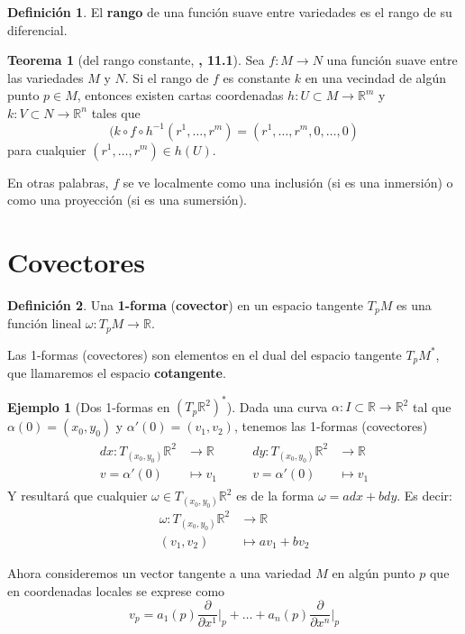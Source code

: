 \documentclass[spanish]{book}
\theoremstyle{definition}
\newtheorem*{defn}{Definición}
\newtheorem*{teo}{Teorema}
\newtheorem*{ejem}{Ejemplo}
\newcommand{\R}{\mathbb{R}}
\begin{document}
\begin{defn}
	El \textbf{rango} de una función suave entre variedades es el rango de su diferencial.
\end{defn}
\begin{teo}[del rango constante, \cite{Loring}\textbf{, 11.1}]
	Sea $f:M\to N$ una función suave entre las variedades $M$ y $N$. Si el rango de $f$ es constante $k$ en una vecindad de algún punto $p\in M$, entonces existen cartas coordenadas $h:U\subset M\to\R^m$ y $k:V\subset N\to\R^n$ tales que
	\[(k\circ f\circ h^{-1}(r^1,\ldots,r^m)=(r^1,\ldots,r^m,0,\ldots,0)\]
	para cualquier $(r^1,\ldots,r^m)\in h(U)$.
\end{teo}
En otras palabras, $f$ se ve localmente como una inclusión (si es una inmersión) o como una proyección (si es una sumersión).
\section{Covectores}
\begin{defn}
	Una \textbf{1-forma} (\textbf{covector}) en un espacio tangente $T_pM$ es una función lineal $\omega:T_pM\to\R$.
\end{defn}
Las 1-formas (covectores) son elementos en el dual del espacio tangente $T_pM^*$, que llamaremos el espacio \textbf{cotangente}.
\begin{ejem}[Dos 1-formas en $(T_p\R^2)^*$]
	Dada una curva $\alpha:I\subset\R\to\R^2$ tal que $\alpha(0)=(x_0,y_0)$ y $\alpha'(0)=(v_1,v_2)$, tenemos las 1-formas (covectores)
	\begin{align*}
		\begin{aligned}
			dx:T_{(x_0,y_0)}\R^2&\to\R\\
			v=\alpha'(0)&\mapsto v_1
		\end{aligned}
		\qquad
		\begin{aligned}
			dy:T_{(x_0,y_0)}\R^2&\to\R\\
			v=\alpha'(0)&\mapsto v_1
		\end{aligned}
	\end{align*}
	Y resultará que cualquier $\omega\in T_(x_0,y_0)\R^2$ es de la forma $\omega=adx+bdy$. Es decir:
	\begin{align*}
		\omega:T_{(x_0,y_0)}\R^2&\to\R\\
		(v_1,v_2)&\mapsto av_1+bv_2
	\end{align*}
\end{ejem}
Ahora consideremos un vector tangente a una variedad $M$ en algún punto $p$ que en coordenadas locales se exprese como
\[v_p=a_1(p)\frac{\partial}{\partial x^1}\Big|_p+\ldots+a_n(p)\frac{\partial}{\partial x^n}\Big|_p\]
\end{document}
